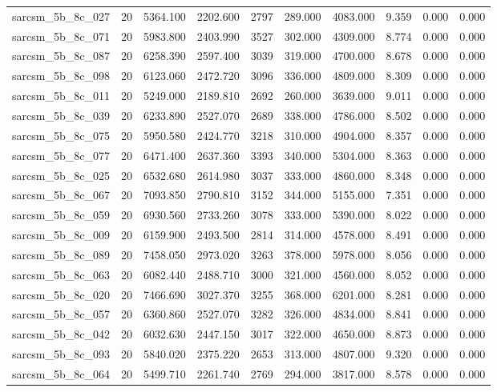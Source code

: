 \begin{tabular}{lrrrrrrrrr}
sarcsm\_5b\_8c\_027 & 20 & 5364.100 & 2202.600 & 2797 & 289.000 & 4083.000 & 9.359 & 0.000 & 0.000 \\
sarcsm\_5b\_8c\_071 & 20 & 5983.800 & 2403.990 & 3527 & 302.000 & 4309.000 & 8.774 & 0.000 & 0.000 \\
sarcsm\_5b\_8c\_087 & 20 & 6258.390 & 2597.400 & 3039 & 319.000 & 4700.000 & 8.678 & 0.000 & 0.000 \\
sarcsm\_5b\_8c\_098 & 20 & 6123.060 & 2472.720 & 3096 & 336.000 & 4809.000 & 8.309 & 0.000 & 0.000 \\
sarcsm\_5b\_8c\_011 & 20 & 5249.000 & 2189.810 & 2692 & 260.000 & 3639.000 & 9.011 & 0.000 & 0.000 \\
sarcsm\_5b\_8c\_039 & 20 & 6233.890 & 2527.070 & 2689 & 338.000 & 4786.000 & 8.502 & 0.000 & 0.000 \\
sarcsm\_5b\_8c\_075 & 20 & 5950.580 & 2424.770 & 3218 & 310.000 & 4904.000 & 8.357 & 0.000 & 0.000 \\
sarcsm\_5b\_8c\_077 & 20 & 6471.400 & 2637.360 & 3393 & 340.000 & 5304.000 & 8.363 & 0.000 & 0.000 \\
sarcsm\_5b\_8c\_025 & 20 & 6532.680 & 2614.980 & 3037 & 333.000 & 4860.000 & 8.348 & 0.000 & 0.000 \\
sarcsm\_5b\_8c\_067 & 20 & 7093.850 & 2790.810 & 3152 & 344.000 & 5155.000 & 7.351 & 0.000 & 0.000 \\
sarcsm\_5b\_8c\_059 & 20 & 6930.560 & 2733.260 & 3078 & 333.000 & 5390.000 & 8.022 & 0.000 & 0.000 \\
sarcsm\_5b\_8c\_009 & 20 & 6159.900 & 2493.500 & 2814 & 314.000 & 4578.000 & 8.491 & 0.000 & 0.000 \\
sarcsm\_5b\_8c\_089 & 20 & 7458.050 & 2973.020 & 3263 & 378.000 & 5978.000 & 8.056 & 0.000 & 0.000 \\
sarcsm\_5b\_8c\_063 & 20 & 6082.440 & 2488.710 & 3000 & 321.000 & 4560.000 & 8.052 & 0.000 & 0.000 \\
sarcsm\_5b\_8c\_020 & 20 & 7466.690 & 3027.370 & 3255 & 368.000 & 6201.000 & 8.281 & 0.000 & 0.000 \\
sarcsm\_5b\_8c\_057 & 20 & 6360.860 & 2527.070 & 3282 & 326.000 & 4834.000 & 8.841 & 0.000 & 0.000 \\
sarcsm\_5b\_8c\_042 & 20 & 6032.630 & 2447.150 & 3017 & 322.000 & 4650.000 & 8.873 & 0.000 & 0.000 \\
sarcsm\_5b\_8c\_093 & 20 & 5840.020 & 2375.220 & 2653 & 313.000 & 4807.000 & 9.320 & 0.000 & 0.000 \\
sarcsm\_5b\_8c\_064 & 20 & 5499.710 & 2261.740 & 2769 & 294.000 & 3817.000 & 8.578 & 0.000 & 0.000 \\

\end{tabular}
